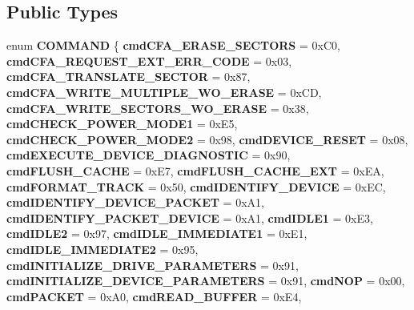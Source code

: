 \subsection*{Public Types}
\begin{DoxyCompactItemize}
\item 
\mbox{\label{class_a_t_a_driver_a4850f4b56a51bb6a52c23db2408ff672}} 
enum {\bfseries C\+O\+M\+M\+A\+ND} \{ \newline
{\bfseries cmd\+C\+F\+A\+\_\+\+E\+R\+A\+S\+E\+\_\+\+S\+E\+C\+T\+O\+RS} = 0x\+C0, 
{\bfseries cmd\+C\+F\+A\+\_\+\+R\+E\+Q\+U\+E\+S\+T\+\_\+\+E\+X\+T\+\_\+\+E\+R\+R\+\_\+\+C\+O\+DE} = 0x03, 
{\bfseries cmd\+C\+F\+A\+\_\+\+T\+R\+A\+N\+S\+L\+A\+T\+E\+\_\+\+S\+E\+C\+T\+OR} = 0x87, 
{\bfseries cmd\+C\+F\+A\+\_\+\+W\+R\+I\+T\+E\+\_\+\+M\+U\+L\+T\+I\+P\+L\+E\+\_\+\+W\+O\+\_\+\+E\+R\+A\+SE} = 0x\+CD, 
\newline
{\bfseries cmd\+C\+F\+A\+\_\+\+W\+R\+I\+T\+E\+\_\+\+S\+E\+C\+T\+O\+R\+S\+\_\+\+W\+O\+\_\+\+E\+R\+A\+SE} = 0x38, 
{\bfseries cmd\+C\+H\+E\+C\+K\+\_\+\+P\+O\+W\+E\+R\+\_\+\+M\+O\+D\+E1} = 0x\+E5, 
{\bfseries cmd\+C\+H\+E\+C\+K\+\_\+\+P\+O\+W\+E\+R\+\_\+\+M\+O\+D\+E2} = 0x98, 
{\bfseries cmd\+D\+E\+V\+I\+C\+E\+\_\+\+R\+E\+S\+ET} = 0x08, 
\newline
{\bfseries cmd\+E\+X\+E\+C\+U\+T\+E\+\_\+\+D\+E\+V\+I\+C\+E\+\_\+\+D\+I\+A\+G\+N\+O\+S\+T\+IC} = 0x90, 
{\bfseries cmd\+F\+L\+U\+S\+H\+\_\+\+C\+A\+C\+HE} = 0x\+E7, 
{\bfseries cmd\+F\+L\+U\+S\+H\+\_\+\+C\+A\+C\+H\+E\+\_\+\+E\+XT} = 0x\+EA, 
{\bfseries cmd\+F\+O\+R\+M\+A\+T\+\_\+\+T\+R\+A\+CK} = 0x50, 
\newline
{\bfseries cmd\+I\+D\+E\+N\+T\+I\+F\+Y\+\_\+\+D\+E\+V\+I\+CE} = 0x\+EC, 
{\bfseries cmd\+I\+D\+E\+N\+T\+I\+F\+Y\+\_\+\+D\+E\+V\+I\+C\+E\+\_\+\+P\+A\+C\+K\+ET} = 0x\+A1, 
{\bfseries cmd\+I\+D\+E\+N\+T\+I\+F\+Y\+\_\+\+P\+A\+C\+K\+E\+T\+\_\+\+D\+E\+V\+I\+CE} = 0x\+A1, 
{\bfseries cmd\+I\+D\+L\+E1} = 0x\+E3, 
\newline
{\bfseries cmd\+I\+D\+L\+E2} = 0x97, 
{\bfseries cmd\+I\+D\+L\+E\+\_\+\+I\+M\+M\+E\+D\+I\+A\+T\+E1} = 0x\+E1, 
{\bfseries cmd\+I\+D\+L\+E\+\_\+\+I\+M\+M\+E\+D\+I\+A\+T\+E2} = 0x95, 
{\bfseries cmd\+I\+N\+I\+T\+I\+A\+L\+I\+Z\+E\+\_\+\+D\+R\+I\+V\+E\+\_\+\+P\+A\+R\+A\+M\+E\+T\+E\+RS} = 0x91, 
\newline
{\bfseries cmd\+I\+N\+I\+T\+I\+A\+L\+I\+Z\+E\+\_\+\+D\+E\+V\+I\+C\+E\+\_\+\+P\+A\+R\+A\+M\+E\+T\+E\+RS} = 0x91, 
{\bfseries cmd\+N\+OP} = 0x00, 
{\bfseries cmd\+P\+A\+C\+K\+ET} = 0x\+A0, 
{\bfseries cmd\+R\+E\+A\+D\+\_\+\+B\+U\+F\+F\+ER} = 0x\+E4, 

\end{DoxyCompactItemize}
